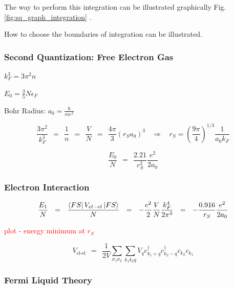\documentclass[10pt]{report}
\numberwithin{equation}{chapter}
\newcommand{\myRef}[1]{
  Fig.\ref{#1}
}
\begin{document}
The way to perform this integration can be illustrated graphically \myRef{fig:sq_graph_integration}. 

How to choose the boundaries of integration can be illustrated. 










\subsubsection*{Second Quantization: Free Electron Gas} %

$ k_F^3 = 3 \pi^2 n$

$ E_0 = \frac{3}{5} N \epsilon_F$

Bohr Radius: $a_0 = \frac{\hbar}{m e^2}$

\begin{equation*}
\frac{3 \pi^2}{k_F^3} ~~ = ~~ \frac{1}{n} ~~ = ~~ \frac{V}{N} ~~ = ~~ \frac{4\pi}{3} \left(r_S a_0 \right)^3 ~~~~ \Rightarrow ~~~~ r_S = \left( \frac{9\pi}{4} \right)^{1/3} \frac{1}{a_0 k_F}
\end{equation*}

\begin{equation*}
\frac{E_0}{N} ~~ = ~~ \frac{2.21}{r_S^2} \frac{e^2}{2a_0}
\end{equation*}



\subsubsection*{Electron Interaction}

\begin{equation*}
  \frac{E_1}{N} ~~ = ~~ \frac{\bra{FS} V_{el-el} \ket{FS}}{N} ~~ = ~~ 
  - \frac{e^2}{2} \frac{V}{N} \frac{k_F^4}{2 \pi^3} ~~=~~ - \frac{0.916}{r_S} \frac{e^2}{2 a_0}
\end{equation*}


\textcolor{red}{plot - energy minimum at $r_S$}


\begin{equation}
  V_\text{el-el} ~~=~~ \frac{1}{2V} \sum_{\sigma_1 \sigma_2} \sum_{k_1 k_2 q} 
    V_q c_{k_1+q}^\dag c_{k_2-q}^\dag c_{k_2} c_{k_1}
\end{equation}



\subsubsection{Fermi Liquid Theory}
\end{document}

